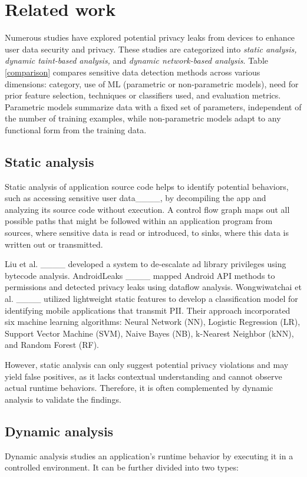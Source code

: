 \section{Related work}
\label{Section2}
Numerous studies have explored potential privacy leaks from devices to enhance user data security and privacy. These studies are categorized into \textit{static analysis, dynamic taint-based analysis,} and \textit{dynamic network-based analysis}. Table \ref{comparison} compares sensitive data detection methods across various dimensions: category, use of ML (parametric or non-parametric models), need for prior feature selection, techniques or classifiers used, and evaluation metrics. Parametric models summarize data with a fixed set of parameters, independent of the number of training examples, while non-parametric models adapt to any functional form from the training data.
\subsection{Static analysis}
Static analysis of application source code helps to identify potential behaviors, such as accessing sensitive user data____, by decompiling the app and analyzing its source code without execution. A control flow graph maps out all possible paths that might be followed within an application program from sources, where sensitive data is read or introduced, to sinks, where this data is written out or transmitted.

Liu et al. ____ developed a system to de-escalate ad library privileges using bytecode analysis. AndroidLeaks ____ mapped Android API methods to permissions and detected privacy leaks using dataflow analysis. Wongwiwatchai et al. ____ utilized lightweight static features to develop a classification model for identifying mobile applications that transmit PII. Their approach incorporated six machine learning algorithms: Neural Network (NN), Logistic Regression (LR), Support Vector Machine (SVM), Naive Bayes (NB), k-Nearest Neighbor (kNN), and Random Forest (RF).

However, static analysis can only suggest potential privacy violations and may yield false positives, as it lacks contextual understanding and cannot observe actual runtime behaviors. Therefore, it is often complemented by dynamic analysis to validate the findings.
\subsection{Dynamic analysis}
Dynamic analysis studies an application's runtime behavior by executing it in a controlled environment. It can be further divided into two types:
